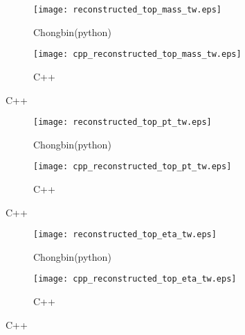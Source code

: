 \documentclass{beamer}
\begin{document}




\begin{frame}
  \begin{figure}[!h]
  \captionsetup[subfigure]{labelformat=empty}
  \begin{subfigure}{.5\textwidth}
  \centering
  \texttt{[image: reconstructed\_top\_mass\_tw.eps]}
  \caption{Chongbin(python)}
  \end{subfigure} \hfill
  \begin{subfigure}{.5\textwidth}
  \centering
  \texttt{[image: cpp\_reconstructed\_top\_mass\_tw.eps]}
  \caption{C++}
  \end{subfigure}
  \end{figure}
\end{frame}

\begin{frame}
  \begin{figure}[!h]
  \captionsetup[subfigure]{labelformat=empty}
  \begin{subfigure}{.5\textwidth}
  \centering
  \texttt{[image: reconstructed\_top\_pt\_tw.eps]}
  \caption{Chongbin(python)}
  \end{subfigure} \hfill
  \begin{subfigure}{.5\textwidth}
  \centering
  \texttt{[image: cpp\_reconstructed\_top\_pt\_tw.eps]}
  \caption{C++}
  \end{subfigure}
  \end{figure}
\end{frame}

\begin{frame}
  \begin{figure}[!h]
  \captionsetup[subfigure]{labelformat=empty}
  \begin{subfigure}{.5\textwidth}
  \centering
  \texttt{[image: reconstructed\_top\_eta\_tw.eps]}
  \caption{Chongbin(python)}
  \end{subfigure} \hfill
  \begin{subfigure}{.5\textwidth}
  \centering
  \texttt{[image: cpp\_reconstructed\_top\_eta\_tw.eps]}
  \caption{C++}
  \end{subfigure}
  \end{figure}
\end{frame}
\end{document}
